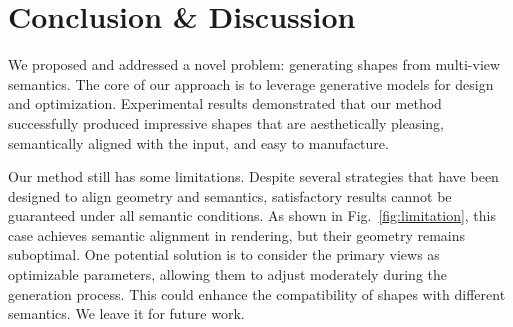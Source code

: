 \section{Conclusion \& Discussion}
We proposed and addressed a novel problem: generating shapes from multi-view semantics. The core of our approach is to leverage generative models for design and optimization. Experimental results demonstrated that our method successfully produced impressive shapes that are aesthetically pleasing, semantically aligned with the input, and easy to manufacture.

Our method still has some limitations. Despite several strategies that have been designed to align geometry and semantics, satisfactory results cannot be guaranteed under all semantic conditions. 
As shown in Fig.~\ref{fig:limitation}, this case achieves semantic alignment in rendering, but their geometry remains suboptimal. One potential solution is to consider the primary views as optimizable parameters, allowing them to adjust moderately during the generation process. This could enhance the compatibility of shapes with different semantics. We leave it for future work.